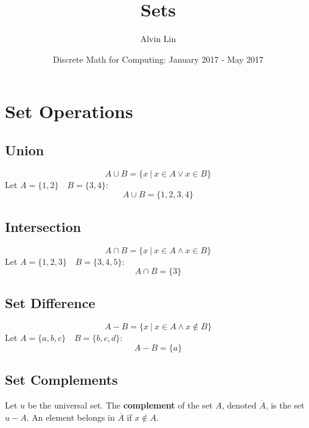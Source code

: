 \documentclass[letterpaper, 12pt]{math}
\title{Sets}
\author{Alvin Lin}
\date{Discrete Math for Computing: January 2017 - May 2017}
\begin{document}
\maketitle

\section*{Set Operations}

\subsection*{Union}
\[ A \cup B = \{x\ |\ x \in A \vee x \in B\} \]
Let \( A = \{1,2\} \quad B = \{3,4\} \):
\[ A \cup B = \{1,2,3,4\} \]

\subsection*{Intersection}
\[ A \cap B = \{x\ |\ x \in A \wedge x \in B\} \]
Let \( A = \{1,2,3\} \quad B = \{3,4,5\} \):
\[ A \cap B = \{3\} \]

\subsection*{Set Difference}
\[ A-B = \{x\ |\ x \in A \wedge x \notin B\} \]
Let \( A = \{a,b,c\} \quad B = \{b,c,d\} \):
\[ A-B = \{a\} \]

\subsection*{Set Complements}
Let \( u \) be the universal set. The \textbf{complement} of the set \( A \),
denoted \( \overline{A} \), is the set \( u-A \). An element belongs in \( \overline{A} \)
if \( x \notin A \).
\end{document}
